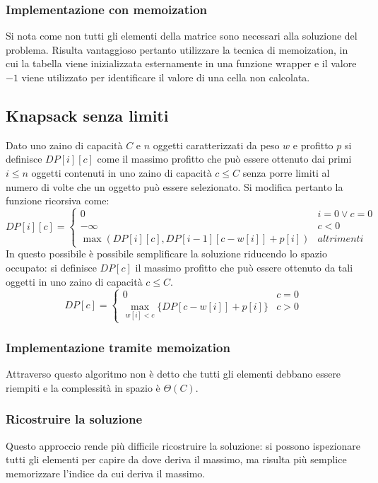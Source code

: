 \subsubsection{Implementazione con memoization}
Si nota come non tutti gli elementi della matrice sono necessari alla soluzione del problema. Risulta vantaggioso pertanto utilizzare la tecnica di 
memoization, in cui la tabella viene inizializzata esternamente in una funzione wrapper e il valore $-1$ viene utilizzato per identificare il valore di
una cella non calcolata. 

\subsection{Knapsack senza limiti}
Dato uno zaino di capacit\`a $C$ e $n$ oggetti caratterizzati da peso $w$ e profitto $p$ si definisce $DP[i][c]$ come il massimo profitto che pu\`o essere
ottenuto dai primi $i\le n$ oggetti contenuti in uno zaino di capacit\`a $c\le C$ senza porre limiti al numero di volte che un oggetto pu\`o essere 
selezionato. Si modifica pertanto la funzione ricorsiva come:
$$
DP[i][c] =
\begin{cases}
0\quad & i = 0 \lor c = 0\\
-\infty & c<0\\
\max(DP[i][c], DP[i-1][c-w[i]]+p[i]) & altrimenti
\end{cases}
$$
In questo possibile \`e possibile semplificare la soluzione riducendo lo spazio occupato: si definisce $DP[c]$ il massimo profitto che pu\`o essere ottenuto
da tali oggetti in uno zaino di capacit\`a $c\le C$. 
$$
DP[c] =
\begin{cases}
0\quad & c = 0\\
\max\limits_{w[i]<c}\{DP[c-w[i]]+p[i]\} &  c > 0
\end{cases}
$$
\subsubsection{Implementazione tramite memoization}

Attraverso questo algoritmo non \`e detto che tutti gli elementi debbano essere riempiti e la complessit\`a in spazio \`e $\Theta(C)$.
\subsubsection{Ricostruire la soluzione}
Questo approccio rende pi\`u difficile ricostruire la soluzione: si possono ispezionare tutti gli elementi per capire da dove deriva il massimo, ma 
risulta pi\`u semplice memorizzare l'indice da cui deriva il massimo. 
